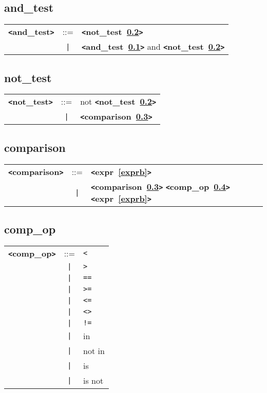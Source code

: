 \documentclass[12pt]{article}
\begin{document}
\subsection{and\_test}
\label{andzzztestb}
\begin{tabular}{lcl}
{\bf \verb+<+and\_test\verb+>+} & ::=  & {\bf \verb+<+not\_test~\ref{notzzztestb}\verb+>+}  \\
 & \verb+|+  & {\bf \verb+<+and\_test~\ref{andzzztestb}\verb+>+}  and {\bf \verb+<+not\_test~\ref{notzzztestb}\verb+>+}  \\
\end{tabular}

\subsection{not\_test}
\label{notzzztestb}
\begin{tabular}{lcl}
{\bf \verb+<+not\_test\verb+>+} & ::=  & not {\bf \verb+<+not\_test~\ref{notzzztestb}\verb+>+}  \\
 & \verb+|+  & {\bf \verb+<+comparison~\ref{comparisonb}\verb+>+}  \\
\end{tabular}

\subsection{comparison}
\label{comparisonb}
\begin{tabular}{lcl}
{\bf \verb+<+comparison\verb+>+} & ::=  & {\bf \verb+<+expr~\ref{exprb}\verb+>+}  \\
 & \verb+|+  & {\bf \verb+<+comparison~\ref{comparisonb}\verb+>+}  {\bf \verb+<+comp\_op~\ref{compzzzopb}\verb+>+}  {\bf \verb+<+expr~\ref{exprb}\verb+>+}  \\
\end{tabular}

\subsection{comp\_op}
\label{compzzzopb}
\begin{tabular}{lcl}
{\bf \verb+<+comp\_op\verb+>+} & ::=  & \verb|<| \\
 & \verb+|+  & \verb|>| \\
 & \verb+|+  & \verb|==| \\
 & \verb+|+  & \verb|>=| \\
 & \verb+|+  & \verb|<=| \\
 & \verb+|+  & \verb|<>| \\
 & \verb+|+  & \verb|!=| \\
 & \verb+|+  & in \\
 & \verb+|+  & not in \\
 & \verb+|+  & is \\
 & \verb+|+  & is not \\
\end{tabular}
\end{document}
